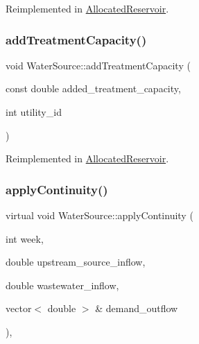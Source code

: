 Reimplemented in \mbox{\hyperlink{classAllocatedReservoir_ab4cd10b1a9b421309844bcec42899b70_ab4cd10b1a9b421309844bcec42899b70}{Allocated\+Reservoir}}.

\mbox{\label{classWaterSource_a210818957f088da4046597d0f1a1340f_a210818957f088da4046597d0f1a1340f}} 
\subsubsection{\texorpdfstring{add\+Treatment\+Capacity()}{addTreatmentCapacity()}}
{\footnotesize\ttfamily void Water\+Source\+::add\+Treatment\+Capacity (\begin{DoxyParamCaption}\item[{const double}]{added\+\_\+treatment\+\_\+capacity,  }\item[{int}]{utility\+\_\+id }\end{DoxyParamCaption})\hspace{0.3cm}{\ttfamily [virtual]}}



Reimplemented in \mbox{\hyperlink{classAllocatedReservoir_ab781bee3253277f1dcfa4c12756d9d6f_ab781bee3253277f1dcfa4c12756d9d6f}{Allocated\+Reservoir}}.

\mbox{\label{classWaterSource_ac070445379fe706f65b977dade4f3fbc_ac070445379fe706f65b977dade4f3fbc}} 
\subsubsection{\texorpdfstring{apply\+Continuity()}{applyContinuity()}}
{\footnotesize\ttfamily virtual void Water\+Source\+::apply\+Continuity (\begin{DoxyParamCaption}\item[{int}]{week,  }\item[{double}]{upstream\+\_\+source\+\_\+inflow,  }\item[{double}]{wastewater\+\_\+inflow,  }\item[{vector$<$ double $>$ \&}]{demand\+\_\+outflow }\end{DoxyParamCaption})\hspace{0.3cm}{\ttfamily [protected]}, {}}



